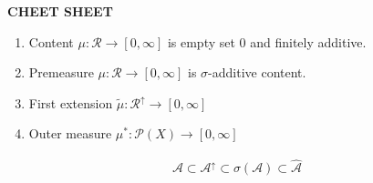 \textbf{CHEET SHEET}
\begin{enumerate}
    \item Content \(\mu: \mathcal{R} \rightarrow [0, \infty]\) is empty set 0 and finitely additive.
    \item Premeasure \(\mu: \mathcal{R} \rightarrow [0, \infty]\) is \(\sigma\)-additive content.
    \item First extension \(\tilde{\mu}: \mathcal{R}^\uparrow \rightarrow [0, \infty]\)
    \item Outer measure \(\mu^*: \mathcal{P}(X) \rightarrow [0, \infty]\)
\end{enumerate}
\begin{align}
    \mathcal{A} \subset \mathcal{A}^\uparrow \subset \sigma(\mathcal{A}) \subset \hat{\mathcal{A}}
\end{align}


